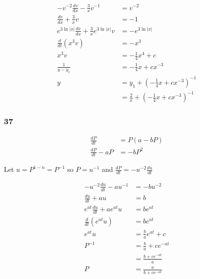 \documentclass{article}
\begin{document}
\begin{enumerate}
        \begin{align*}
          -v^{-2} \frac{dv}{dx} - \frac{3}{x} v^{-1}                & = v^{-2}                                                      \\
          \frac{dv}{dx} + \frac{3}{x} v                             & = -1                                                          \\
          e^{3 \ln |x|} \frac{dv}{dx} + \frac{3}{x} e^{3 \ln |x|} v & = -e^{3 \ln |x|}                                              \\
          \frac{d}{dt} (x^3 v)                                      & = -x^3                                                        \\
          x^3 v                                                     & = -\frac{1}{4} x^4 + c                                        \\
          \frac{1}{y - y_1}                                         & = -\frac{1}{4} x + c x^{-3}                                   \\
          y                                                         & = y_1 + \left( -\frac{1}{4} x + c x^{-3} \right)^{-1}         \\
                                                                    & = \frac{2}{x} + \left( -\frac{1}{4} x + c x^{-3} \right)^{-1}
        \end{align*}
\end{enumerate}

\subsubsection{37}

\begin{align*}
  \frac{dP}{dt}       & = P (a - b P) \\
  \frac{dP}{dt} - a P & = - b P^2
\end{align*}

Let $u = P^{1 - n} = P^{-1}$ so $P = u^{-1}$ and $\frac{dP}{dt} = -u^{-2} \frac{du}{dt}$

\begin{align*}
  -u^{-2} \frac{du}{dt} - a u^{-1}    & = -b u^{-2}                \\
  \frac{du}{dt} + a u                 & = b                        \\
  e^{a t} \frac{du}{dt} + a e^{a t} u & = b e^{a t}                \\
  \frac{d}{dt} (e^{a t} u)            & = b e^{a t}                \\
  e^{a t} u                           & = \frac{b}{a} e^{a t} + c  \\
  P^{-1}                              & = \frac{b}{a} + c e^{-a t} \\
                                      & = \frac{b + c e^{-a t}}{a} \\
  P                                   & = \frac{a}{b + c e^{-a t}}
\end{align*}
\end{document}
